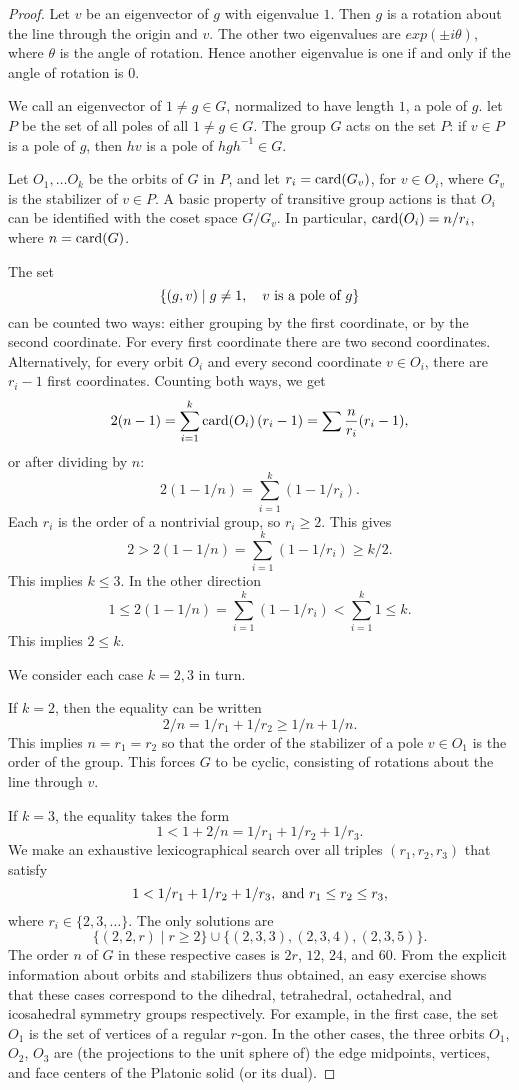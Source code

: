 \documentclass{llncs}
\def\op#1{{\hbox{#1}}}
\def\card#1{\op{card}{#1}}
\begin{document}
\begin{proof}
  Let $v$ be an eigenvector
of $g$ with eigenvalue $1$.  Then $g$ is a rotation about the line through the origin and $v$.  The other
two eigenvalues are $exp(\pm i \theta)$, where $\theta$ is the angle of rotation.  Hence another eigenvalue
is one if and only if the angle of rotation is $0$.

We call an eigenvector of $1\ne g\in G$, normalized to have length $1$, a pole of $g$.  let $P$ be the
set of all poles of all $1\ne g\in G$.  
The group $G$ acts on the set $P$: if $v\in P$ is a pole of $g$, then $h v$ is a pole of $h g h^{-1}\in G$.

Let $O_1,\ldots O_k$ be the orbits of $G$ in $P$, and let $r_i=\card(G_v)$, for $v\in O_i$,
where $G_v$ is the stabilizer of $v\in P$.
A basic property
of transitive group actions is that $O_i$ can be identified with the coset space $G/G_v$.
In particular, $\card(O_i) = n/r_i$, where $n=\card(G)$.

The set
\[
\{(g,v)\mid g\ne 1,\quad v \hbox{ is a pole of } g\}
\]
can be counted two ways: either grouping by the first coordinate, or by the second coordinate.
For every first coordinate there are two second coordinates.  Alternatively,
for every orbit $O_i$ and every second coordinate $v\in O_i$, there
are $r_i - 1$ first coordinates.  Counting both ways, we get
\[
2 (n-1) = \sum_{i=1}^k \card{(O_i)}\, (r_i - 1) =  \sum \frac{n}{r_i}(r_i-1),
\]
or after dividing by $n$:
\[
2 (1 - 1/n) = \sum_{i=1}^k (1-1/r_i).
\]
Each $r_i$ is the order of a nontrivial group, so $r_i\ge2$.
This gives
\[
2 > 2 (1-1/n) =\sum_{i=1}^k (1-1/r_i) \ge k/2.
\]
This implies $k\le 3$.  
In the other direction
\[
1 \le 2(1-1/n) = \sum_{i=1}^k (1-1/r_i) < \sum_{i=1}^k 1 \le k.
\]
This implies $2\le k$.

We consider each case $k=2,3$ in turn.

If $k=2$, then the equality can be written
\[
2/n = 1/r_1 + 1/r_2 \ge 1/n + 1/n.
\]
This implies $n=r_1 = r_2$ so that the order of the stabilizer of a
pole $v\in O_1$ is the order of the group.  This forces $G$ to be
cyclic, consisting of rotations about the line through $v$.

If $k=3$, the equality takes the form
\[
1< 1 + 2/n = 1/r_1 + 1/r_2 + 1/r_3.
\]
We make an exhaustive lexicographical search over all triples
$(r_1,r_2,r_3)$ that satisfy
\[
1 < 1/r_1 + 1/r_2 + 1/r_3, \hbox{ and } r_1 \le r_2 \le r_3,
\]
where $r_i \in \{2,3,\ldots\}$.
The only solutions are 
\[
\{ (2,2,r)\mid r\ge 2\} \cup \{(2,3,3),(2,3,4),(2,3,5)\}.
\]
The order $n$ of $G$ in these respective cases is $2r$, $12$, $24$,
and $60$.  From the explicit information about orbits and stabilizers
thus obtained, an easy exercise shows that these cases correspond to
the dihedral, tetrahedral, octahedral, and icosahedral symmetry groups
respectively.  For example, in the first case, the set $O_1$ is the
set of vertices of a regular $r$-gon. In the other cases, the three
orbits $O_1$, $O_2$, $O_3$ are (the projections to the unit sphere of)
the edge midpoints, vertices, and face centers of the Platonic
solid (or its dual).
\end{proof}
\end{document}
